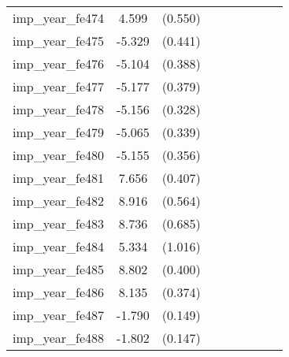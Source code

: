 {\begin{tabular}{l*{4}{cc}}
imp\_year\_fe474&    4.599\sym{***}&  (0.550)&                  &         &                  &         &                  &         \\
imp\_year\_fe475&   -5.329\sym{***}&  (0.441)&                  &         &                  &         &                  &         \\
imp\_year\_fe476&   -5.104\sym{***}&  (0.388)&                  &         &                  &         &                  &         \\
imp\_year\_fe477&   -5.177\sym{***}&  (0.379)&                  &         &                  &         &                  &         \\
imp\_year\_fe478&   -5.156\sym{***}&  (0.328)&                  &         &                  &         &                  &         \\
imp\_year\_fe479&   -5.065\sym{***}&  (0.339)&                  &         &                  &         &                  &         \\
imp\_year\_fe480&   -5.155\sym{***}&  (0.356)&                  &         &                  &         &                  &         \\
imp\_year\_fe481&    7.656\sym{***}&  (0.407)&                  &         &                  &         &                  &         \\
imp\_year\_fe482&    8.916\sym{***}&  (0.564)&                  &         &                  &         &                  &         \\
imp\_year\_fe483&    8.736\sym{***}&  (0.685)&                  &         &                  &         &                  &         \\
imp\_year\_fe484&    5.334\sym{***}&  (1.016)&                  &         &                  &         &                  &         \\
imp\_year\_fe485&    8.802\sym{***}&  (0.400)&                  &         &                  &         &                  &         \\
imp\_year\_fe486&    8.135\sym{***}&  (0.374)&                  &         &                  &         &                  &         \\
imp\_year\_fe487&   -1.790\sym{***}&  (0.149)&                  &         &                  &         &                  &         \\
imp\_year\_fe488&   -1.802\sym{***}&  (0.147)&                  &         &                  &         &                  &         \\

\end{tabular}}
